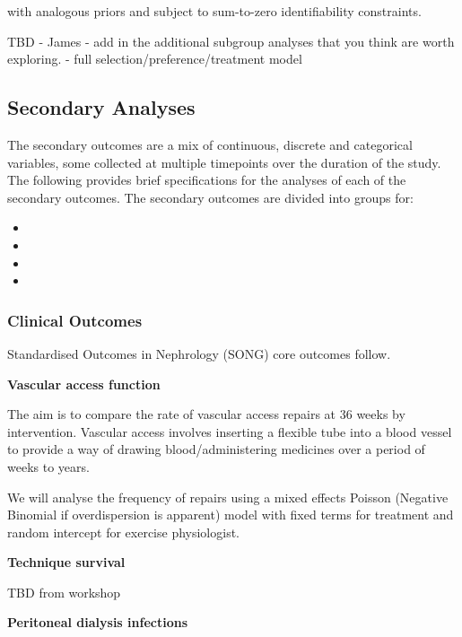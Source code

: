 \documentclass[
]{article}
\begin{document}
with analogous priors and subject to sum-to-zero identifiability constraints.

TBD - James - add in the additional subgroup analyses that you think are worth exploring.
- full selection/preference/treatment model

\hypertarget{secondary-analyses}{%
  \subsection{Secondary Analyses}\label{secondary-analyses}}

The secondary outcomes are a mix of continuous, discrete and categorical variables, some collected at multiple timepoints over the duration of the study.
The following provides brief specifications for the analyses of each of the secondary outcomes.
The secondary outcomes are divided into groups for:

\begin{itemize}
  \item {}
  \item {}
  \item {}
  \item {}
\end{itemize}

\hypertarget{clinical-outcomes}{%
  \subsubsection{Clinical Outcomes}\label{clinical-outcomes}}

Standardised Outcomes in Nephrology (SONG) core outcomes follow.

\textbf{Vascular access function}

The aim is to compare the rate of vascular access repairs at 36 weeks by intervention.
Vascular access involves inserting a flexible tube into a blood vessel to provide a way of drawing blood/administering medicines over a period of weeks to years.

We will analyse the frequency of repairs using a mixed effects Poisson (Negative Binomial if overdispersion is apparent) model with fixed terms for treatment and random intercept for exercise physiologist.

\textbf{Technique survival}

TBD from workshop

\textbf{Peritoneal dialysis infections}
\end{document}
